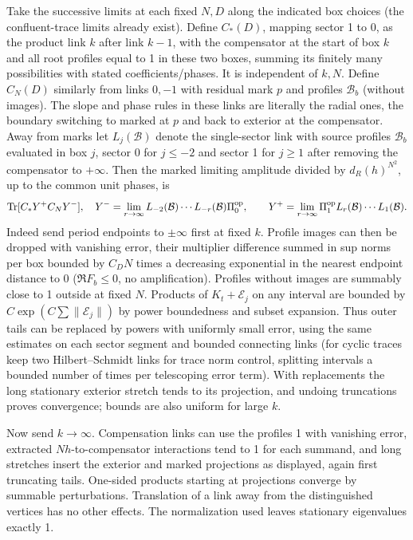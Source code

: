 Take the successive limits at each fixed \(N,D\) along the indicated box choices (the confluent-trace limits already exist). Define \(C_*(D)\), mapping sector 1 to 0, as the product link \(k\) after link \(k-1\), with the compensator at the start of box \(k\) and all root profiles equal to 1 in these two boxes, summing its finitely many possibilities with stated coefficients/phases. It is independent of \(k,N\). Define \(C_N(D)\) similarly from links \(0,-1\) with residual mark \(p\) and profiles \(\mathcal B_b\) (without images). The slope and phase rules in these links are literally the radial ones, the boundary switching to marked at \(p\) and back to exterior at the compensator. Away from marks let \(L_j(\mathcal B)\) denote the single-sector link with source profiles \(\mathcal B_b\) evaluated in box \(j\), sector 0 for \(j\le -2\) and sector 1 for \(j\ge1\) after removing the compensator to \(+\infty\).
Then the marked limiting amplitude divided by \(d_R(h)^{N^2}\), up to the common unit phases, is
\[
 \operatorname{Tr}[C_* Y^+ C_N Y^-],\quad
 Y^-=\lim_{r\to\infty}L_{-2}(\mathcal B)\cdots L_{-r}(\mathcal B)\Pi_0^{\rm op},\qquad
 Y^+=\lim_{r\to\infty}\Pi_1^{\rm op} L_r(\mathcal B)\cdots L_1(\mathcal B).
\]
Indeed send period endpoints to \(\pm\infty\) first at fixed \(k\). Profile images can then be dropped with vanishing error, their multiplier difference summed in sup norms per box bounded by \(C_D N\) times a decreasing exponential in the nearest endpoint distance to 0 (\(\Re F_b\le0\), no amplification). Profiles without images are summably close to 1 outside at fixed \(N\). Products of \(K_t+\mathcal E_j\) on any interval are bounded by \(C\exp(C\sum\|\mathcal E_j\|)\) by power boundedness and subset expansion. Thus outer tails can be replaced by powers with uniformly small error, using the same estimates on each sector segment and bounded connecting links (for cyclic traces keep two Hilbert--Schmidt links for trace norm control, splitting intervals a bounded number of times per telescoping error term). With replacements the long stationary exterior stretch tends to its projection, and undoing truncations proves convergence; bounds are also uniform for large \(k\).

Now send \(k\to\infty\). Compensation links can use the profiles 1 with vanishing error, extracted \(Nh\)-to-compensator interactions tend to 1 for each summand, and long stretches insert the exterior and marked projections as displayed, again first truncating tails. One-sided products starting at projections converge by summable perturbations. Translation of a link away from the distinguished vertices has no other effects. The normalization used leaves stationary eigenvalues exactly 1.


